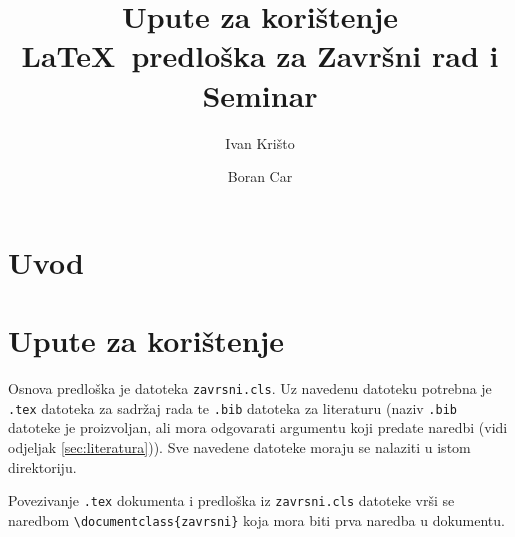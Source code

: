 \documentclass{zavrsni}
\begin{document}
\title{Upute za korištenje \LaTeX~predloška za Završni rad i Seminar}
\author{Ivan Krišto \and Boran Car}

\maketitle

\tableofcontents

\chapter{Uvod}

\chapter{Upute za korištenje}
Osnova predloška je datoteka \texttt{zavrsni.cls}. Uz navedenu datoteku potrebna
je \texttt{.tex} datoteka za sadržaj rada te \texttt{.bib} datoteka za literaturu
(naziv \texttt{.bib} datoteke je proizvoljan, ali mora odgovarati argumentu koji
predate naredbi \verb|| (vidi odjeljak \ref{sec:literatura})). Sve
navedene datoteke moraju se nalaziti u istom direktoriju.

Povezivanje \texttt{.tex} dokumenta i predloška iz \texttt{zavrsni.cls}
datoteke vrši se naredbom \verb|\documentclass{zavrsni}| koja mora biti prva
naredba u dokumentu.
\end{document}
